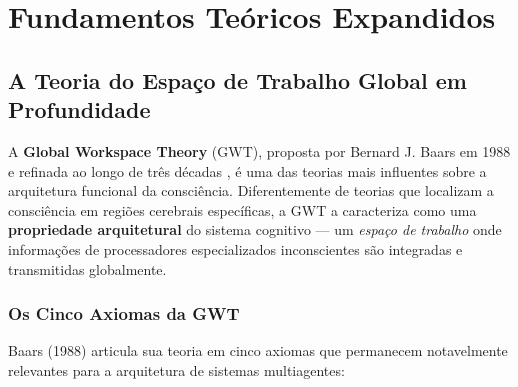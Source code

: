 \section{Fundamentos Teóricos Expandidos}
\label{sec:theory-expanded}

\subsection{A Teoria do Espaço de Trabalho Global em Profundidade}

A \textbf{Global Workspace Theory} (GWT), proposta por Bernard J. Baars em 1988 \cite{Baars1988_GWT} e refinada ao longo de três décadas \cite{Baars1997_Theater}, é uma das teorias mais influentes sobre a arquitetura funcional da consciência. Diferentemente de teorias que localizam a consciência em regiões cerebrais específicas, a GWT a caracteriza como uma \textbf{propriedade arquitetural} do sistema cognitivo — um \textit{espaço de trabalho} onde informações de processadores especializados inconscientes são integradas e transmitidas globalmente.

\subsubsection{Os Cinco Axiomas da GWT}

Baars (1988) articula sua teoria em cinco axiomas que permanecem notavelmente relevantes para a arquitetura de sistemas multiagentes:

